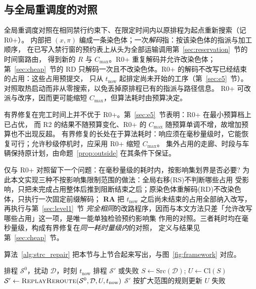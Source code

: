 \subsection{与全局重调度的对照}
\label{sec:vs_r0}

全局重调度对照在相同禁行约束下、在限定时间内以原排程为起点重新搜索（记 R0+）。
内部把 \((x,\pi)\) 编成一条染色体；一次\emph{解码}指：按该染色体的指派与加工顺序，
在已写入禁行窗的预约表上从头为全部运输调用第~\ref{sec:reservation}~节的时间窗路由，
得到新的 \(R\) 与 \(C_{\max}\)。R0+ 重复解码并允许改染色体；第~\ref{sec:cheap}~节的
RD 只解码一次且不改染色体。R0+ 的解码不改写已经结束的占用：这些占用预提交，
只从 \(t_{\mathrm{now}}\) 起排定尚未开始的工序（第~\ref{sec:e5}~节）。
对照取热启动而非从零搜索，以免丢掉原排程已有的指派与路径信息。
R0+ 可改派与改序，因而更可能缩短 \(C_{\max}\)，但算法耗时由预算决定。

有界修复在完工时间上并不优于 R0+。第~\ref{sec:e5}~节表明：R0+ 在最小预算档上已占优，
而 R2 的结果不随预算变化、R0+ 的 \(C_{\max}\) 随预算单调不增，故增加预算也不出现反超。
有界修复的长处在于算法耗时：响应须在毫秒量级时，它能恢复可行；允许秒级停机时，应采用 R0+ 缩短 \(C_{\max}\)。
集外占用的走廊、时段与车辆保持原计划，由命题~\ref{prop:outside} 在其条件下保证。

仅与 R0+ 对照留下一个问题：在毫秒量级的耗时内，按影响集划界是否必要?
为此本文实现三种不按影响集限制范围的做法：全局右移(RS)不判断哪些占用
受影响，只把未完成占用整体后推到阻断结束之后；原染色体重解码(RD)不改染色体，只执行一次固定前缀解码；
\textbf{RA} 把 \(t_{\mathrm{now}}\) 之后尚未结束的占用全部纳入改写，再执行与第~\ref{sec:level1}~节
\emph{完全相同}的改路程序，因而与本文方法只差「允许改写哪些占用」这一项，是唯一能单独检验预约影响集
作用的对照。三者耗时均在毫秒量级，构成有界修复在\emph{同一耗时量级内}的对照，
定义与结果见第~\ref{sec:cheap}~节。

算法~\ref{alg:strc_repair} 把本节与上节合起来写出，与图~\ref{fig:framework} 对应。

\begin{algorithm}[t]
\caption{基于预约影响集的有界修复（第 1 级改路 + 扩大范围）}
\label{alg:strc_repair}
\begin{algorithmic}[1]
\Require 排程 \(\mathcal{S}^0\)，扰动 \(\mathcal{D}\)，时刻 \(t_{\mathrm{now}}\)
\Ensure 排程 \(\mathcal{S}'\) 或失败
\State \(S \gets \mathrm{Src}(\mathcal{D})\);
      \(U \gets \mathrm{Cl}(S)\)
  \State \(\mathcal{S}' \gets \textsc{ReplayReroute}(\mathcal{S}^0,\mathcal{D},U,t_{\mathrm{now}})\)
    \State \Return \(\mathcal{S}'\)
  \EndIf
  \State 按扩大范围的规则更新 \(U\) 
\EndFor
\State \Return 失败
\end{algorithmic}
\end{algorithm}

